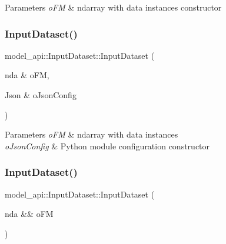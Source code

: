 \begin{DoxyParams}{Parameters}
{\em o\+FM} & ndarray with data instances constructor \\
\hline
\end{DoxyParams}
\mbox{\label{classmodel__api_1_1InputDataset_a1743888ce461e7fa367ee6d2aad70082}} 
\subsubsection{\texorpdfstring{Input\+Dataset()}{InputDataset()}\hspace{0.1cm}{\footnotesize\ttfamily [2/3]}}
{\footnotesize\ttfamily model\+\_\+api\+::\+Input\+Dataset\+::\+Input\+Dataset (\begin{DoxyParamCaption}\item[{nda \&}]{o\+FM,  }\item[{Json \&}]{o\+Json\+Config }\end{DoxyParamCaption})}


\begin{DoxyParams}{Parameters}
{\em o\+FM} & ndarray with data instances \\
\hline
{\em o\+Json\+Config} & Python module configuration constructor \\
\hline
\end{DoxyParams}
\mbox{\label{classmodel__api_1_1InputDataset_a213885343387992b05a173ecb70a628f}} 
\subsubsection{\texorpdfstring{Input\+Dataset()}{InputDataset()}\hspace{0.1cm}{\footnotesize\ttfamily [3/3]}}
{\footnotesize\ttfamily model\+\_\+api\+::\+Input\+Dataset\+::\+Input\+Dataset (\begin{DoxyParamCaption}\item[{nda \&\&}]{o\+FM }\end{DoxyParamCaption})}


